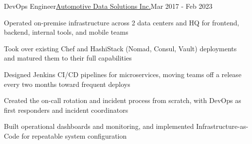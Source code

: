 \begin{joblong}{DevOps Engineer}{\href{https://www.adsdata.ca}{Automotive Data Solutions Inc.}}{Mar 2017 - Feb 2023}
\item Operated on-premise infrastructure across 2 data centers and HQ for frontend, backend, internal tools, and mobile teams
\item Took over existing Chef and HashiStack (Nomad, Consul, Vault) deployments and matured them to their full capabilities
\item Designed Jenkins CI/CD pipelines for microservices, moving teams off a release every two months toward frequent deploys
\item Created the on-call rotation and incident process from scratch, with DevOps as first responders and incident coordinators
\item Built operational dashboards and monitoring, and implemented Infrastructure-as-Code for repeatable system configuration
\end{joblong}

